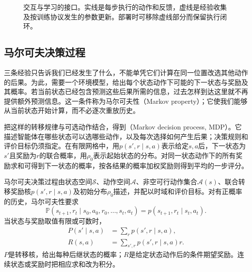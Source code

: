 \begin{figure}[htbp]
  \centering
  
  \caption{交互与学习的接口。实线是每步执行的动作和反馈，虚线是经验收集及按训练协议发生的参数更新。部署时可移除虚线部分而保留执行闭环。}
  \label{fig:rl-overview-loop}
\end{figure}

\subsection{马尔可夫决策过程}
\label{sec:rl-overview-mdp}

三条经验只告诉我们已经发生了什么，不能单凭它们计算在同一位置改选其他动作的后果。为此，需要一个环境模型，给出每个状态动作下可能的下一状态与奖励及其概率。若当前状态已经包含预测这些后果所需的信息，过去怎样到达这里就不再提供额外预测信息。这一条件称为马尔可夫性（Markov property）；它使我们能够从当前状态开始计算，而不必逐次重放历史。

把这样的转移规律与可选动作结合，得到（Markov decision process, MDP）。它描述智能体在哪些状态可以选哪些动作，以及每次选择如何产生后果；决策规则和评价目标仍须指定。在有限网格中，用$p(s',r\mid s,a)$表示给定$s,a$后，下一状态为$s'$且奖励为$r$的联合概率，用$\rho_0$表示起始状态的分布。对同一状态动作下的所有奖励求和可得到下一状态的概率，按各结果的概率加权奖励则得到平均的一步评分。

\begin{definition}[马尔可夫决策过程]
  \label{def:rl-overview-mdp}
  马尔可夫决策过程由状态空间$\mathcal S$、动作空间$\mathcal A$、非空可行动作集合$\mathcal A(s)$、联合转移奖励核$p(s',r\mid s,a)$及初始分布$\rho_0$描述，并配以时域和评价目标。对有正概率的历史，马尔可夫性要求
  \begin{equation}
    \mathbb P(s_{t+1},r_t\mid s_0,a_0,r_0,\ldots,s_t,a_t)
    =p(s_{t+1},r_t\mid s_t,a_t).
    \label{eq:rl-overview-markov}
  \end{equation}
  当状态与奖励取值有限或可数时，
  \begin{equation}
  \begin{aligned}
    P(s'\mid s,a)&=\sum_r p(s',r\mid s,a),\\
    R(s,a)&=\sum_{s',r}p(s',r\mid s,a)r.
  \end{aligned}
  \label{eq:rl-overview-kernels}
  \end{equation}
  $P$是转移核，给出每种后继状态的概率；$R$是给定状态动作后的条件期望奖励。连续状态或奖励时把相应求和改为积分。
\end{definition}

